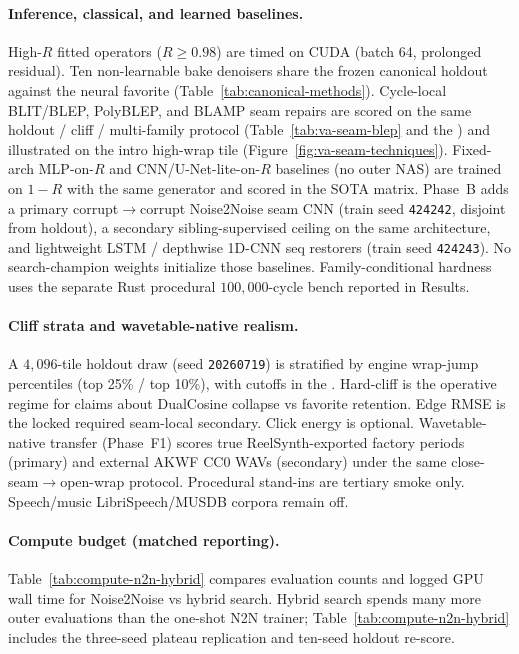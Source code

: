 \paragraph{Inference, classical, and learned baselines.}
High-$R$ fitted operators ($R\ge 0.98$) are timed on CUDA (batch 64, prolonged residual).
Ten non-learnable bake denoisers share the frozen canonical holdout against the neural favorite (Table~\ref{tab:canonical-methods}).
Cycle-local BLIT/BLEP, PolyBLEP, and BLAMP seam repairs are scored on the same holdout / cliff / multi-family protocol (Table~\ref{tab:va-seam-blep} and the ) and illustrated on the intro high-wrap tile (Figure~\ref{fig:va-seam-techniques}).
Fixed-arch MLP-on-$R$ and CNN/U-Net-lite-on-$R$ baselines (no outer NAS) are trained on $1{-}R$ with the same generator and scored in the SOTA matrix.
Phase~B adds a primary corrupt$\to$corrupt Noise2Noise seam CNN (train seed \texttt{424242}, disjoint from holdout), a secondary sibling-supervised ceiling on the same architecture, and lightweight LSTM / depthwise 1D-CNN seq restorers (train seed \texttt{424243}).
No search-champion weights initialize those baselines.
Family-conditional hardness uses the separate Rust procedural $100{,}000$-cycle bench reported in Results.

\paragraph{Cliff strata and wavetable-native realism.}
A $4{,}096$-tile holdout draw (seed \texttt{20260719}) is stratified by engine wrap-jump percentiles (top 25\% / top 10\%), with cutoffs in the .
Hard-cliff is the operative regime for claims about DualCosine collapse vs favorite retention.
Edge RMSE is the locked required seam-local secondary. Click energy is optional.
Wavetable-native transfer (Phase~F1) scores true ReelSynth-exported factory periods (primary) and external AKWF CC0 WAVs (secondary) under the same close-seam$\to$open-wrap protocol.
Procedural stand-ins are tertiary smoke only.
Speech/music LibriSpeech/MUSDB corpora remain off.


\paragraph{Compute budget (matched reporting).}
Table~\ref{tab:compute-n2n-hybrid} compares evaluation counts and logged GPU wall time for Noise2Noise vs hybrid search.
Hybrid search spends many more outer evaluations than the one-shot N2N trainer; Table~\ref{tab:compute-n2n-hybrid} includes the three-seed plateau replication and ten-seed holdout re-score.


